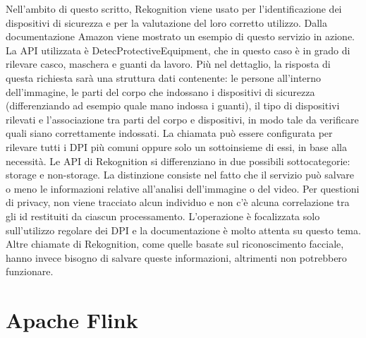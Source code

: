 \noindent Nell'ambito di questo scritto, Rekognition viene usato per l'identificazione dei dispositivi di sicurezza e per la valutazione del loro corretto utilizzo. Dalla documentazione Amazon viene mostrato un esempio di questo servizio in azione. La API utilizzata è DetecProtectiveEquipment, che in questo caso è in grado di rilevare casco, maschera e guanti da lavoro. Più nel dettaglio, la risposta di questa richiesta sarà una struttura dati contenente: le persone all'interno dell'immagine, le parti del corpo che indossano i dispositivi di sicurezza (differenziando ad esempio quale mano indossa i guanti), il tipo di dispositivi rilevati e l'associazione tra parti del corpo e dispositivi, in modo tale da verificare quali siano correttamente indossati. La chiamata può essere configurata per rilevare tutti i DPI più comuni oppure solo un sottoinsieme di essi, in base alla necessità. Le API di Rekognition si differenziano in due possibili sottocategorie: storage e non-storage. La distinzione consiste nel fatto che il servizio può salvare o meno le informazioni relative all'analisi dell'immagine o del video. Per questioni di privacy, non viene tracciato alcun individuo e non c'è alcuna correlazione tra gli id restituiti da ciascun processamento. L'operazione è focalizzata solo sull'utilizzo regolare dei DPI e la documentazione è molto attenta su questo tema. Altre chiamate di Rekognition, come quelle basate sul riconoscimento facciale, hanno invece bisogno di salvare queste informazioni, altrimenti non potrebbero funzionare.

\section{Apache Flink}

